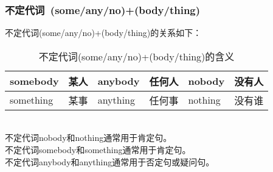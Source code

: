 \documentclass[UTF8]{ctexart}
\newcommand{\littf}[1]{{\hspace{3pt}\ttfamily #1}}
\begin{document}
\subsubsection{不定代词~\littf{(some/any/no)+(body/thing)}}\vspace{5pt}
    不定代词\littf{(some/any/no)+(body/thing)}的关系如下：\vspace{5pt}
    \begin{table}[h]
        \begin{center}
            \ttfamily
            \begin{tabular}{p{60pt}|p{40pt}|p{60pt}|p{40pt}|p{60pt}|p{40pt}}
                \hline
                somebody&某人&anybody&任何人&nobody&没有人\\ \hline
                something&某事&anything&任何事&nothing&没有谁\\ \hline
            \end{tabular}
            \rmfamily
            \caption{不定代词\littf{(some/any/no)+(body/thing)}的含义}
        \end{center}
    \end{table}\\
    不定代词\littf{nobody}和\littf{nothing}通常用于肯定句。\\[3mm]
    不定代词\littf{somebody}和\littf{something}通常用于肯定句。\\[3mm]
    不定代词\littf{anybody}和\littf{anything}通常用于否定句或疑问句。


\newpage
\end{document}
